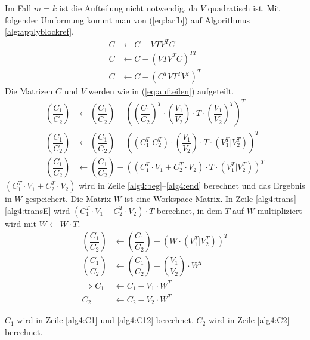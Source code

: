 Im Fall $ m = k $ ist die Aufteilung nicht notwendig, da $ V $ quadratisch ist.
\newpage
Mit folgender Umformung kommt man von (\ref{eq:larfb}) auf Algorithmus \ref{alg:applyblockref}.
\begin{align*}
	C &\leftarrow  C - V T V^T C \\
	C &\leftarrow C - \left(V T V^T C\right)^{TT} 	\\
	C &\leftarrow  C - \left(C^T  V  T^T  V^T\right)^T
\end{align*}
Die Matrizen $C$ und $V$ werden wie in (\ref{eq:aufteilen}) aufgeteilt.
\begin{align*}
	\left(\dfrac{C_1}{C_2}\right) &\leftarrow  \left(\dfrac{C_1}{C_2}\right) -  \left( \left(\dfrac{C_1}{C_2}\right)^T \cdot \left(\dfrac{V_1}{V_2}\right) \cdot T \cdot \left(\dfrac{V_1}{V_2}\right)^T \right)^T \\
	\left(\dfrac{C_1}{C_2}\right) &\leftarrow  \left(\dfrac{C_1}{C_2}\right) - \left( \left(C_1^T|C_2^T\right)	\cdot \left(\dfrac{V_1}{V_2}\right) \cdot T \cdot \left(V_1^T|V_2^T\right) \right)^T \\
	\left(\dfrac{C_1}{C_2}\right) &\leftarrow  \left(\dfrac{C_1}{C_2}\right) - \left( \left( C_1^T \cdot V_1 + C_2^T \cdot V_2 \right) \cdot T \cdot \left(V_1^T|V_2^T\right) \right)^T 
\end{align*}
$ \left( C_1^T \cdot V_1 + C_2^T \cdot V_2 \right) $ wird in Zeile \ref{alg4:beg}--\ref{alg4:end} berechnet und das Ergebnis in $W$ gespeichert. Die Matrix $W$ ist eine Workspace-Matrix. In Zeile \ref{alg4:trans}--\ref{alg4:transE} wird  $ \left( C_1^T \cdot V_1 + C_2^T \cdot V_2 \right) \cdot T$ berechnet, in dem $T$ auf $W$ multipliziert wird mit $W \leftarrow W \cdot T$. 
\begin{align*}
	\left(\dfrac{C_1}{C_2}\right) &\leftarrow  \left(\dfrac{C_1}{C_2}\right) - \left( W \cdot \left(V_1^T|V_2^T\right) \right)^T \\
	\left(\dfrac{C_1}{C_2}\right) &\leftarrow  \left(\dfrac{C_1}{C_2}\right) - \left(\dfrac{V_1}{V_2}\right) \cdot W^T 	\\
	\Longrightarrow C_1 &\leftarrow C_1 - V_1 \cdot W^T\\
	C_2 &\leftarrow C_2 - V_2 \cdot W^T	
\end{align*}

$C_1$ wird in Zeile \ref{alg4:C1} und \ref{alg4:C12} berechnet. $C_2$ wird in Zeile \ref{alg4:C2} berechnet.



